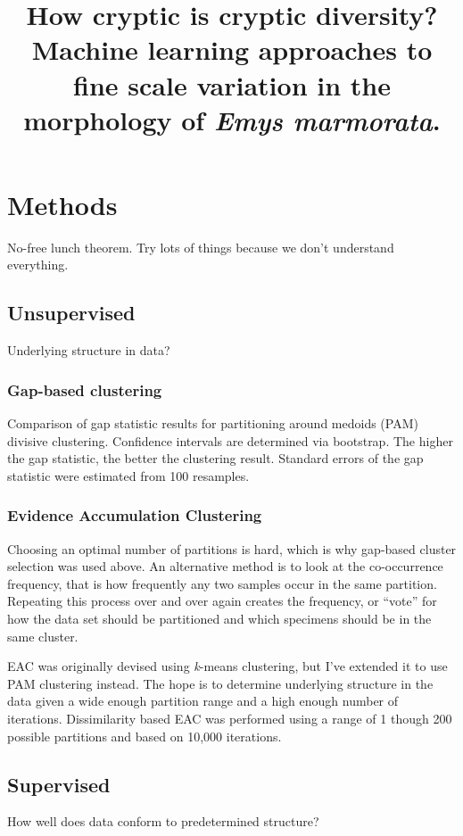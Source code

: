 \documentclass{article}\usepackage{graphicx, color}
\title{How cryptic is cryptic diversity? Machine learning approaches to fine scale variation in the morphology of \textit{Emys marmorata}.}
\begin{document}
\maketitle


\section{Methods}
No-free lunch theorem. Try lots of things because we don't understand everything.

\subsection{Unsupervised}
Underlying structure in data?

\subsubsection{Gap-based clustering}
Comparison of gap statistic results for partitioning around medoids (PAM) divisive clustering. Confidence intervals are determined via bootstrap. The higher the gap statistic, the better the clustering result. Standard errors of the gap statistic were estimated from 100 resamples.


\subsubsection{Evidence Accumulation Clustering}
Choosing an optimal number of partitions is hard, which is why gap-based cluster selection was used above. An alternative method is to look at the co-occurrence frequency, that is how frequently any two samples occur in the same partition. Repeating this process over and over again creates the frequency, or ``vote'' for how the data set should be partitioned and  which specimens should be in the same cluster.

EAC was originally devised using \textit{k}-means clustering, but I've extended it to use PAM clustering instead. The hope is to determine underlying structure in the data given a wide enough partition range and a high enough number of iterations. Dissimilarity based EAC was performed using a range of 1 though 200 possible partitions and based on 10,000 iterations.

\subsection{Supervised}
How well does data conform to predetermined structure?
\end{document}
